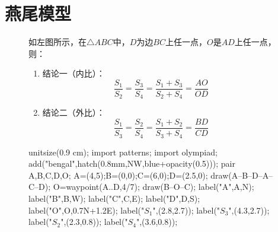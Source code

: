 \documentclass[12pt,space]{ctexart} %
\begin{document}
\section{燕尾模型}
\begin{figure}[ht]
	\begin{minipage}[b]{0.45\textwidth}
		如左图所示，在$\triangle ABC$中，$D$为边$BC$上任一点，$O$是$AD$上任一点，则：
		\begin{enumerate}
			\item 结论一（内比）：
			      \[
				      \frac{S_1}{S_2}=\frac{S_3}{S_4}=\frac{S_1+S_3}{S_2+S_4}=\frac{AO}{OD}
			      \]
			\item 结论二（外比）：
			      \[
				      \frac{S_1}{S_3}=\frac{S_2}{S_4}=\frac{S_1+S_2}{S_3+S_4}=\frac{BD}{CD}
			      \]
		\end{enumerate}
	\end{minipage}
	\qquad
	\begin{minipage}[b]{0.45\textwidth}
		\begin{asy}
			unitsize(0.9 cm);
			import patterns;
			import olympiad;
			add("bengal",hatch(0.8mm,NW,blue+opacity(0.5)));
			pair A,B,C,D,O;
			A=(4,5);B=(0,0);C=(6,0);D=(2.5,0);
			draw(A--B--D--A--C--D);
			O=waypoint(A..D,4/7);
			draw(B--O--C);
			label("A",A,N);
			label("B",B,W);
			label("C",C,E);
			label("D",D,S);
			label("O",O,0.7N+1.2E);
			label("$S_1$",(2.8,2.7));
			label("$S_3$",(4.3,2.7));
			label("$S_2$",(2.3,0.8));
			label("$S_4$",(3.6,0.8));
		\end{asy}
	\end{minipage}
\end{figure}
\vspace{1cm}
\end{document}
